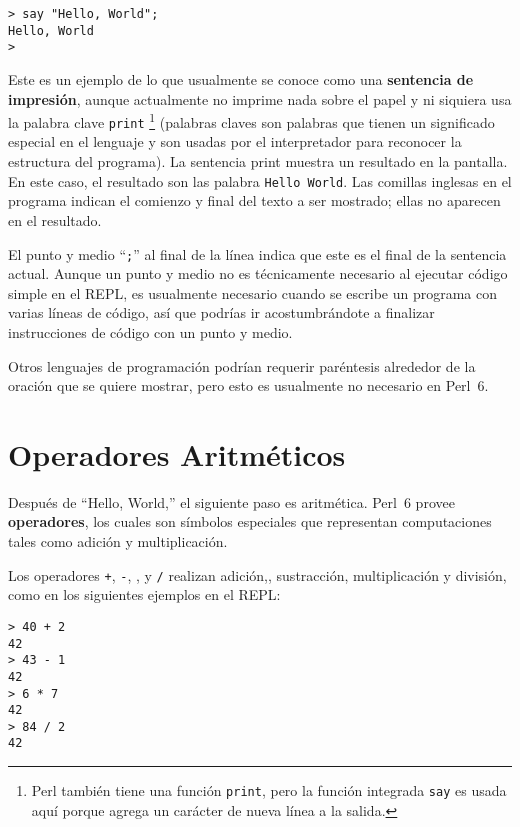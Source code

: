 \begin{lstlisting}
> say "Hello, World";
Hello, World
>
\end{lstlisting}
%
Este es un ejemplo de lo que usualmente se conoce como una {\bf sentencia de impresión},
aunque actualmente no imprime nada sobre el papel y ni siquiera usa la palabra clave
{\tt print} 
\footnote{Perl también tiene una función {\tt print},
pero la función integrada {\tt say} es usada aquí 
porque agrega un carácter de nueva línea a la salida.}
(palabras claves son palabras que tienen un significado especial
en el lenguaje y son usadas por el interpretador para reconocer la
estructura del programa).
La sentencia print muestra un resultado en la pantalla. En este caso, 
el resultado son las palabra {\tt Hello World}.
%
Las comillas inglesas en el programa indican el comienzo y final
del texto a ser mostrado; ellas no aparecen en el resultado.

El punto y medio ``{\tt ;}'' al final de la línea indica
que este es el final de la sentencia actual. Aunque un punto y medio
no es técnicamente necesario al ejecutar código simple en el REPL, 
es usualmente necesario cuando se escribe un programa con varias líneas
de código, así que podrías ir acostumbrándote a finalizar instrucciones
de código con un punto y medio.   

Otros lenguajes de programación podrían requerir paréntesis
alrededor de la oración que se quiere mostrar, pero esto es usualmente 
no necesario en Perl~6.

\section{Operadores Aritméticos}

Después de ``Hello, World,'' el siguiente paso es aritmética. Perl~6 provee {\bf operadores}, los cuales son símbolos especiales que representan computaciones tales como adición y multiplicación.

Los operadores {\tt +}, {\tt -}, {\tt *}, y {\tt /} realizan adición,, sustracción, multiplicación y división, como en los siguientes ejemplos en el REPL:

\begin{lstlisting}
> 40 + 2
42
> 43 - 1
42
> 6 * 7
42
> 84 / 2
42
\end{lstlisting}
%

